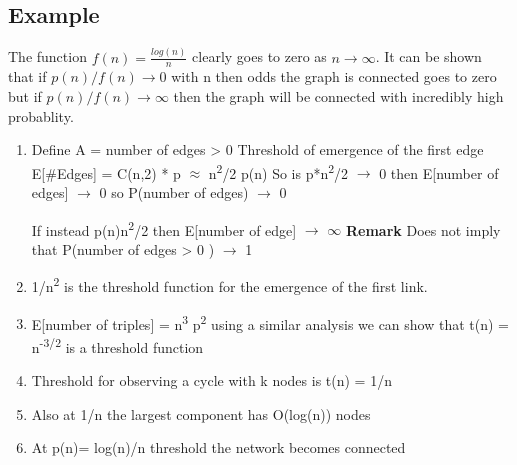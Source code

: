 \documentclass[11pt]{article}
\begin{document}
\subsection{Example}
\label{sec:orgfb7a5c2}
The function \(f(n) = \frac{log(n)}{n}\) clearly goes to zero as \(n \to \infty\). It can be shown that if \(p(n) / f(n) \to 0\) with n then odds the graph is connected goes to zero but if \(p(n)/f(n) \to \infty\) then the graph will be connected with incredibly high probablity.

\begin{enumerate}
\item Define A = number of edges > 0
Threshold of emergence of the first edge E[\#Edges] = C(n,2) * p \(\approx\) n\textsuperscript{2}/2 p(n)
 So is p*n\textsuperscript{2}/2 \(\to\) 0 then E[number of edges] \(\to\) 0 so P(number of edges) \(\to\) 0

If instead p(n)n\textsuperscript{2}/2 then E[number of edge] \(\to\) \(\infty\)
\textbf{Remark} Does not imply that P(number of edges > 0 ) \(\to\) 1

\item 1/n\textsuperscript{2} is the threshold function for the emergence of the first link.

\item E[number of triples] = n\textsuperscript{3} p\textsuperscript{2} using a similar analysis we can show that t(n) = n\textsuperscript{-3/2} is a threshold function
\item Threshold for observing a cycle with k nodes is t(n) = 1/n
\item Also at 1/n the largest component has O(log(n)) nodes
\item At p(n)= log(n)/n threshold the network becomes connected
\end{enumerate}
\end{document}
